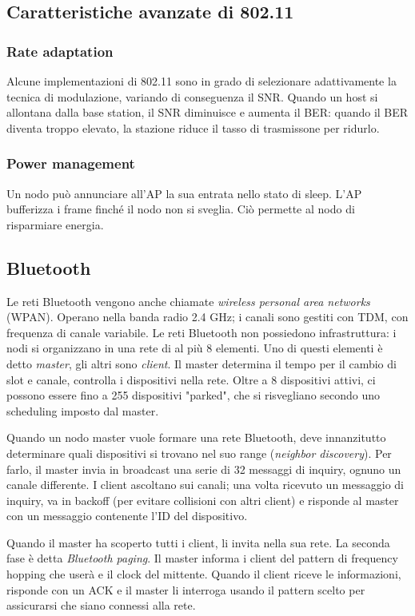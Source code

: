 \documentclass[11pt]{book}
\begin{document}
\subsection{Caratteristiche avanzate di 802.11}
\subsubsection{Rate adaptation}
Alcune implementazioni di 802.11 sono in grado di selezionare adattivamente la tecnica di modulazione, variando di conseguenza
il SNR. Quando un host si allontana dalla base station, il SNR diminuisce e aumenta il BER: quando il BER diventa troppo 
elevato, la stazione riduce il tasso di trasmissone per ridurlo.
\subsubsection{Power management}
Un nodo può annunciare all'AP la sua entrata nello stato di sleep. L'AP bufferizza i frame finché il nodo non si sveglia.
Ciò permette al nodo di risparmiare energia.
\subsection{Bluetooth}
Le reti Bluetooth vengono anche chiamate \textit{wireless personal area networks} (WPAN). Operano nella banda radio 2.4 
GHz; i canali sono gestiti con TDM, con frequenza di canale variabile. Le reti Bluetooth non possiedono infrastruttura:
i nodi si organizzano in una rete di al più 8 elementi. Uno di questi elementi è detto \textit{master}, gli altri sono 
\textit{client}. Il master determina il tempo per il cambio di slot e canale, controlla i dispositivi nella rete. Oltre 
a 8 dispositivi attivi, ci possono essere fino a 255 dispositivi "parked", che si risvegliano secondo uno scheduling imposto 
dal master.

Quando un nodo master vuole formare una rete Bluetooth, deve innanzitutto determinare quali dispositivi si trovano nel 
suo range (\textit{neighbor discovery}). Per farlo, il master invia in broadcast una serie di 32 messaggi di inquiry,
ognuno un canale differente. I client ascoltano sui canali; una volta ricevuto un messaggio di inquiry, va in backoff 
(per evitare collisioni con altri client) e risponde al master con un messaggio contenente l'ID del dispositivo. 

Quando il master ha scoperto tutti i client, li invita nella sua rete. La seconda fase è detta \textit{Bluetooth paging}.
Il master informa i client del pattern di frequency hopping che userà e il clock del mittente. Quando il client riceve le 
informazioni, risponde con un ACK e il master li interroga usando il pattern scelto per assicurarsi che siano connessi alla
rete. 
\end{document}
